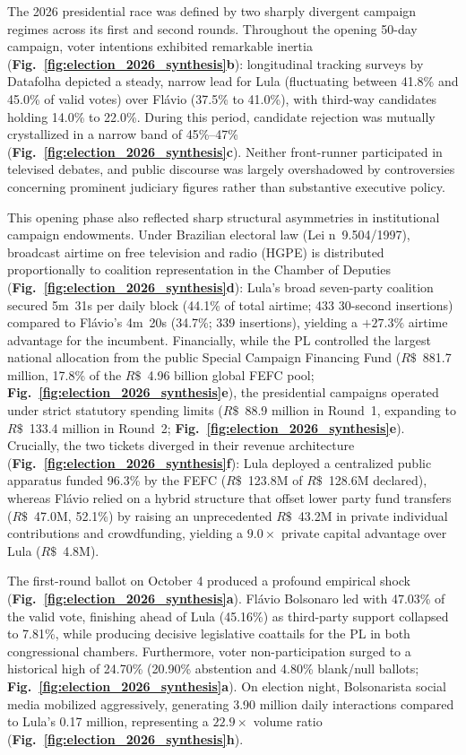 \documentclass{article}
\begin{document}
The 2026 presidential race was defined by two sharply divergent campaign regimes across its first and second rounds. Throughout the opening 50-day campaign, voter intentions exhibited remarkable inertia (\textbf{Fig.~\ref{fig:election_2026_synthesis}b}): longitudinal tracking surveys by Datafolha depicted a steady, narrow lead for Lula (fluctuating between 41.8\% and 45.0\% of valid votes) over Fl\'avio (37.5\% to 41.0\%), with third-way candidates holding 14.0\% to 22.0\%. During this period, candidate rejection was mutually crystallized in a narrow band of 45\%--47\% (\textbf{Fig.~\ref{fig:election_2026_synthesis}c}). Neither front-runner participated in televised debates, and public discourse was largely overshadowed by controversies concerning prominent judiciary figures rather than substantive executive policy. 

This opening phase also reflected sharp structural asymmetries in institutional campaign endowments. Under Brazilian electoral law (Lei n\textordmasculine~9.504/1997), broadcast airtime on free television and radio (HGPE) is distributed proportionally to coalition representation in the Chamber of Deputies (\textbf{Fig.~\ref{fig:election_2026_synthesis}d}): Lula's broad seven-party coalition secured 5m~31s per daily block (44.1\% of total airtime; 433 30-second insertions) compared to Fl\'avio's 4m~20s (34.7\%; 339 insertions), yielding a $+27.3\%$ airtime advantage for the incumbent. Financially, while the PL controlled the largest national allocation from the public Special Campaign Financing Fund ($R\$$~881.7 million, 17.8\% of the $R\$$~4.96 billion global FEFC pool; \textbf{Fig.~\ref{fig:election_2026_synthesis}e}), the presidential campaigns operated under strict statutory spending limits ($R\$$~88.9 million in Round~1, expanding to $R\$$~133.4 million in Round~2; \textbf{Fig.~\ref{fig:election_2026_synthesis}e}). Crucially, the two tickets diverged in their revenue architecture (\textbf{Fig.~\ref{fig:election_2026_synthesis}f}): Lula deployed a centralized public apparatus funded 96.3\% by the FEFC ($R\$$~123.8M of $R\$$~128.6M declared), whereas Fl\'avio relied on a hybrid structure that offset lower party fund transfers ($R\$$~47.0M, 52.1\%) by raising an unprecedented $R\$$~43.2M in private individual contributions and crowdfunding, yielding a $9.0\times$ private capital advantage over Lula ($R\$$~4.8M).

The first-round ballot on October 4 produced a profound empirical shock (\textbf{Fig.~\ref{fig:election_2026_synthesis}a}). Fl\'avio Bolsonaro led with 47.03\% of the valid vote, finishing ahead of Lula (45.16\%) as third-party support collapsed to 7.81\%, while producing decisive legislative coattails for the PL in both congressional chambers. Furthermore, voter non-participation surged to a historical high of 24.70\% (20.90\% abstention and 4.80\% blank/null ballots; \textbf{Fig.~\ref{fig:election_2026_synthesis}a}). On election night, Bolsonarista social media mobilized aggressively, generating 3.90 million daily interactions compared to Lula's 0.17 million, representing a $22.9\times$ volume ratio (\textbf{Fig.~\ref{fig:election_2026_synthesis}h}).
\end{document}
